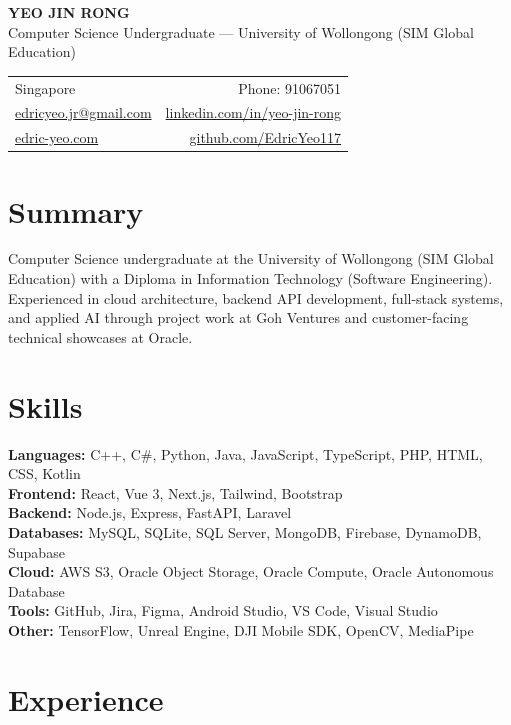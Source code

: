 \documentclass[10pt,a4paper]{article}
\begin{document}
{\LARGE \textbf{YEO JIN RONG}}\\[-3pt]
\textcolor{muted}{Computer Science Undergraduate — University of Wollongong (SIM Global Education)}\\[5pt]

\begin{tabularx}{\textwidth}{@{}X r@{}}
Singapore &
Phone: 91067051 \\
\href{mailto:edricyeo.jr@gmail.com}{edricyeo.jr@gmail.com} &
\href{https://www.linkedin.com/in/yeo-jin-rong/}{linkedin.com/in/yeo-jin-rong} \\
\href{https://edric-yeo.com/}{edric-yeo.com} &
\href{https://github.com/EdricYeo117}{github.com/EdricYeo117} \\
\end{tabularx}

\section*{Summary}
Computer Science undergraduate at the University of Wollongong (SIM Global Education) with a Diploma in Information Technology (Software Engineering). Experienced in cloud architecture, backend API development, full-stack systems, and applied AI through project work at Goh Ventures and customer-facing technical showcases at Oracle.

\section*{Skills}
\textbf{Languages:} C++, C\#, Python, Java, JavaScript, TypeScript, PHP, HTML, CSS, Kotlin \\
\textbf{Frontend:} React, Vue 3, Next.js, Tailwind, Bootstrap \\
\textbf{Backend:} Node.js, Express, FastAPI, Laravel \\
\textbf{Databases:} MySQL, SQLite, SQL Server, MongoDB, Firebase, DynamoDB, Supabase \\
\textbf{Cloud:} AWS S3, Oracle Object Storage, Oracle Compute, Oracle Autonomous Database \\
\textbf{Tools:} GitHub, Jira, Figma, Android Studio, VS Code, Visual Studio \\
\textbf{Other:} TensorFlow, Unreal Engine, DJI Mobile SDK, OpenCV, MediaPipe

\section*{Experience}
\end{document}
